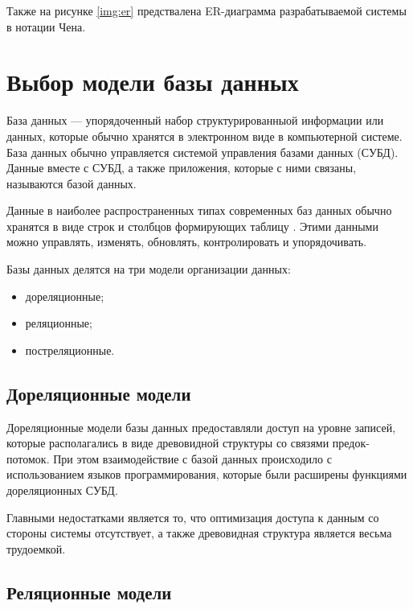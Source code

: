 Также на рисунке \ref{img:er} предствалена ER-диаграмма \cite{er} разрабатываемой системы в нотации Чена.






\section{Выбор модели базы данных}

База данных \cite{db-is} --- упорядоченный набор структурированныой информации или данных, которые обычно хранятся в электронном виде в компьютерной системе. База данных обычно управляется системой управления базами данных (СУБД). Данные вместе с СУБД, а также приложения, которые с ними связаны, называются базой данных.

Данные в наиболее распространенных типах современных баз данных обычно хранятся в виде строк и столбцов формирующих таблицу \cite{db-is}. Этими данными можно управлять, изменять, обновлять, контролировать и упорядочивать.

Базы данных делятся на три модели организации данных:

\begin{itemize}
    \item дореляционные;
    \item реляционные;
    \item постреляционные.
\end{itemize}


\subsection{Дореляционные модели}

Дореляционные модели базы данных \cite{pre_sql} предоставляли доступ на уровне записей, которые располагались в виде древовидной структуры со связями предок-потомок. При этом взаимодействие с базой данных происходило с использованием языков программирования, которые были расширены функциями дореляционных СУБД. 

Главными недостатками является то, что оптимизация доступа к данным со стороны системы отсутствует, а также древовидная структура является весьма трудоемкой.


\subsection{Реляционные модели}

